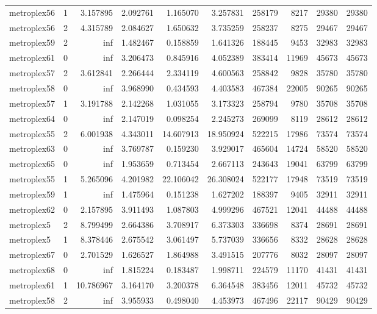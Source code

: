 \begin{longtable}{|l|r|r|r|r|r|r|r|r|r|}
metroplex56 & 1 & 3.157895 & 2.092761 & 1.165070 & 3.257831 & 258179 & 8217 & 29380 & 29380 \\
metroplex56 & 2 & 4.315789 & 2.084627 & 1.650632 & 3.735259 & 258237 & 8275 & 29467 & 29467 \\
metroplex59 & 2 & inf & 1.482467 & 0.158859 & 1.641326 & 188445 & 9453 & 32983 & 32983 \\
metroplex61 & 0 & inf & 3.206473 & 0.845916 & 4.052389 & 383414 & 11969 & 45673 & 45673 \\
metroplex57 & 2 & 3.612841 & 2.266444 & 2.334119 & 4.600563 & 258842 & 9828 & 35780 & 35780 \\
metroplex58 & 0 & inf & 3.968990 & 0.434593 & 4.403583 & 467384 & 22005 & 90265 & 90265 \\
metroplex57 & 1 & 3.191788 & 2.142268 & 1.031055 & 3.173323 & 258794 & 9780 & 35708 & 35708 \\
metroplex64 & 0 & inf & 2.147019 & 0.098254 & 2.245273 & 269099 & 8119 & 28612 & 28612 \\
metroplex55 & 2 & 6.001938 & 4.343011 & 14.607913 & 18.950924 & 522215 & 17986 & 73574 & 73574 \\
metroplex63 & 0 & inf & 3.769787 & 0.159230 & 3.929017 & 465604 & 14724 & 58520 & 58520 \\
metroplex65 & 0 & inf & 1.953659 & 0.713454 & 2.667113 & 243643 & 19041 & 63799 & 63799 \\
metroplex55 & 1 & 5.265096 & 4.201982 & 22.106042 & 26.308024 & 522177 & 17948 & 73519 & 73519 \\
metroplex59 & 1 & inf & 1.475964 & 0.151238 & 1.627202 & 188397 & 9405 & 32911 & 32911 \\
metroplex62 & 0 & 2.157895 & 3.911493 & 1.087803 & 4.999296 & 467521 & 12041 & 44488 & 44488 \\
metroplex5 & 2 & 8.799499 & 2.664386 & 3.708917 & 6.373303 & 336698 & 8374 & 28691 & 28691 \\
metroplex5 & 1 & 8.378446 & 2.675542 & 3.061497 & 5.737039 & 336656 & 8332 & 28628 & 28628 \\
metroplex67 & 0 & 2.701529 & 1.626527 & 1.864988 & 3.491515 & 207776 & 8032 & 28097 & 28097 \\
metroplex68 & 0 & inf & 1.815224 & 0.183487 & 1.998711 & 224579 & 11170 & 41431 & 41431 \\
metroplex61 & 1 & 10.786967 & 3.164170 & 3.200378 & 6.364548 & 383456 & 12011 & 45732 & 45732 \\
metroplex58 & 2 & inf & 3.955933 & 0.498040 & 4.453973 & 467496 & 22117 & 90429 & 90429 \\

\end{longtable}
